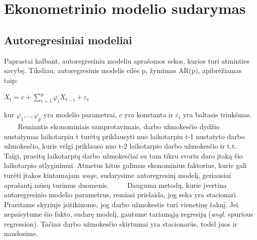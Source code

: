 \documentclass[12pt,a4paper]{article}
\theoremstyle{change}\newtheorem{salyga}{Uždavinys}
\begin{document}
\pagebreak









\section{Ekonometrinio modelio sudarymas}
\bigskip





\subsection{Autoregresiniai modeliai}
\medskip
\hspace{40pt}Paprastai kalbant, autoregresiniu modeliu aprašomos sekos, kurios turi atminties savybę. Tiksliau, autoregresinis modelis eilės p, žymimas AR(p), apibrėžiamas taip: 
\begin{center}
\large $ X_t=c+\sum\limits_{i=1}^{p}\varphi_i X_{t-i}+\varepsilon_t $
\end{center}
kur $ \varphi_1,..,\varphi_p $ yra modelio parametrai, $ c $ yra konstanta ir $ \varepsilon_t $ yra baltasis triukšmas.
\vskip 8pt
$\qquad$Remiantis ekonominiais samprotavimais, darbo užmokesčio dydžio nustatymas laikotarpiu t turėtų priklausyti nuo laikotarpiu t-1 nustatyto darbo užmokesčio, kuris vėlgi  priklauso nuo t-2 laikotarpio darbo užmokesčio ir t.t. Taigi, praeitų laikotarpių darbo užmokesčiai su tam tikru svoriu daro įtaką šio laikotarpio atlyginimui. Atmetus kitus galimus ekonominius faktorius, kurie gali turėti įtakos kintamajam \textit{wage}, sudarysime autoregresinį modelį, geriausiai aprašantį mūsų turimus duomenis.
\vskip 8pt
$\qquad$ Dauguma metodų, kurie įvertina autoregresinio modelio parametrus, remiasi prielaida, jog seka yra stacionari. Praeitame skyriuje įsitikinome, jog darbo užmokestis turi vienetinę šaknį. Jei nepaisytume šio fakto, sudarę modelį, gautume tariamąją regresiją (\textit{angl.} spurious regression). Tačiau darbo užmokesčio skirtumai yra stacionarūs, todėl juos ir naudosime.
\vskip 8pt
\end{document}
